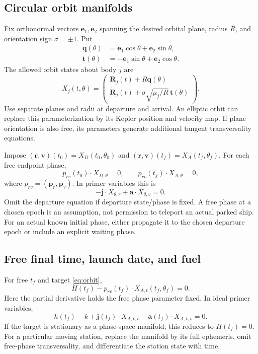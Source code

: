 \documentclass[journal, a4paper]{IEEEtran}
\begin{document}
\subsection{Circular orbit manifolds}
Fix orthonormal vectors $\mathbf e_1,\mathbf e_2$ spanning the desired orbital plane, radius $R$, and orientation sign $\sigma=\pm1$. Put
\begin{align}
 \mathbf q(\theta)&=\mathbf e_1\cos\theta+\mathbf e_2\sin\theta,\nonumber\\
 \mathbf t(\theta)&=-\mathbf e_1\sin\theta+\mathbf e_2\cos\theta.
\end{align}
The allowed orbit states about body $j$ are
\begin{equation}
 X_j(t,\theta)=
 \begin{pmatrix}
 \mathbf R_j(t)+R\mathbf q(\theta)\\
 \dot{\mathbf R}_j(t)+\sigma\sqrt{\mu_j/R}\,\mathbf t(\theta)
 \end{pmatrix}.
 \label{eq:orbit}
\end{equation}
Use separate planes and radii at departure and arrival. An elliptic orbit can replace this parameterization by its Kepler position and velocity map. If plane orientation is also free, its parameters generate additional tangent transversality equations.

Impose $(\mathbf r,\mathbf v)(t_0)=X_D(t_0,\theta_0)$ and $(\mathbf r,\mathbf v)(t_f)=X_A(t_f,\theta_f)$. For each free endpoint phase,
\begin{equation}
 p_{rv}(t_0)\cdot X_{D,\theta}=0,\qquad
 p_{rv}(t_f)\cdot X_{A,\theta}=0,
 \label{eq:phaseend}
\end{equation}
where $p_{rv}=(\mathbf p_r,\mathbf p_v)$. In primer variables this is
\begin{equation}
 -\mathbf j\cdot X_{\theta,r}+\mathbf a\cdot X_{\theta,v}=0.
\end{equation}
Omit the departure equation if departure state/phase is fixed. A free phase at a chosen epoch is an assumption, not permission to teleport an actual parked ship. For an actual known initial phase, either propagate it to the chosen departure epoch or include an explicit waiting phase.

\subsection{Free final time, launch date, and fuel}
For free $t_f$ and target \eqref{eq:orbit},
\begin{equation}
 \boxed{H(t_f)-p_{rv}(t_f)\cdot X_{A,t}(t_f,\theta_f)=0.}
 \label{eq:tf}
\end{equation}
Here the partial derivative holds the free phase parameter fixed. In ideal primer variables,
\begin{equation}
 h(t_f)-k+\mathbf j(t_f)\cdot X_{A,t,r}
              -\mathbf a(t_f)\cdot X_{A,t,v}=0.
 \label{eq:tfprimer}
\end{equation}
If the target is stationary as a phase-space manifold, this reduces to $H(t_f)=0$. For a particular moving station, replace the manifold by its full ephemeris, omit free-phase transversality, and differentiate the station state with time.
\end{document}
